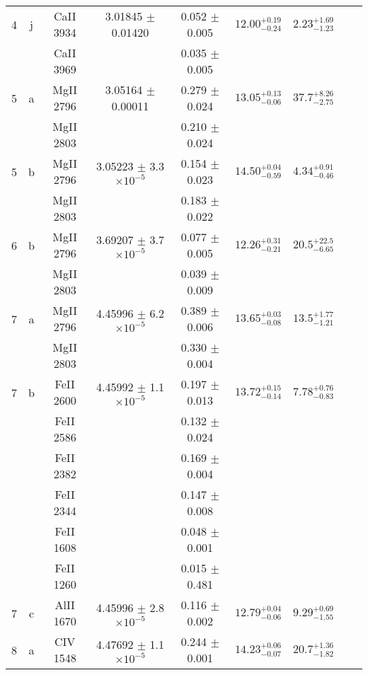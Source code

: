 \documentclass[12pt]{article}
\begin{document}
\begin{footnotesize}
\begin{longtable}{ c c c c c c c c c}
       4  & j  & CaII     3934  &  3.01845 $\pm$ 0.01420  &  0.052 $\pm$ 0.005   & $12.00_{ - 0.24}^{ + 0.19}$  & $2.23_{ - 1.23}^{ + 1.69}$    & 	 & \\ 
  &   & CaII     3969  &  &  0.035 $\pm$ 0.005   &   &     & 	 & \\ 
       5  & a  & MgII     2796  &  3.05164 $\pm$ 0.00011  &  0.279 $\pm$ 0.024   & $13.05_{ - 0.06}^{ + 0.13}$  & $37.7_{ - 2.75}^{ + 8.26}$    & 	 & \\ 
  &   & MgII     2803  &  &  0.210 $\pm$ 0.024   &   &     & 	 & \\ 
       5  & b  & MgII     2796  &  3.05223 $\pm$ 3.3 $\times 10^{-5}$   &  0.154 $\pm$ 0.023   & $14.50_{ - 0.59}^{ + 0.04}$  & $4.34_{ - 0.46}^{ + 0.91}$    & 	 & \\ 
  &   & MgII     2803  &  &  0.183 $\pm$ 0.022   &   &     & 	 & \\ 
       6  & b  & MgII     2796  &  3.69207 $\pm$ 3.7 $\times 10^{-5}$   &  0.077 $\pm$ 0.005   & $12.26_{ - 0.21}^{ + 0.31}$  & $20.5_{ - 6.65}^{ + 22.5}$    & 	 & \\ 
  &   & MgII     2803  &  &  0.039 $\pm$ 0.009   &   &     & 	 & \\ 
       7  & a  & MgII     2796  &  4.45996 $\pm$ 6.2 $\times 10^{-5}$   &  0.389 $\pm$ 0.006   & $13.65_{ - 0.08}^{ + 0.03}$  & $13.5_{ - 1.21}^{ + 1.77}$    & 	 & \\ 
  &   & MgII     2803  &  &  0.330 $\pm$ 0.004   &   &     & 	 & \\ 
       7  & b  & FeII     2600  &  4.45992 $\pm$ 1.1 $\times 10^{-5}$   &  0.197 $\pm$ 0.013   & $13.72_{ - 0.14}^{ + 0.15}$  & $7.78_{ - 0.83}^{ + 0.76}$    & 	 & \\ 
  &   & FeII     2586  &  &  0.132 $\pm$ 0.024   &   &     & 	 & \\ 
  &   & FeII     2382  &  &  0.169 $\pm$ 0.004   &   &     & 	 & \\ 
  &   & FeII     2344  &  &  0.147 $\pm$ 0.008   &   &     & 	 & \\ 
  &   & FeII     1608  &  &  0.048 $\pm$ 0.001   &   &     & 	 & \\ 
  &   & FeII     1260  &  &  0.015 $\pm$ 0.481   &   &     & 	 & \\ 
       7  & c  & AlII     1670  &  4.45996 $\pm$ 2.8 $\times 10^{-5}$   &  0.116 $\pm$ 0.002   & $12.79_{ - 0.06}^{ + 0.04}$  & $9.29_{ - 1.55}^{ + 0.69}$    & 	 & \\ 
       8  & a  & CIV     1548  &  4.47692 $\pm$ 1.1 $\times 10^{-5}$   &  0.244 $\pm$ 0.001   & $14.23_{ - 0.07}^{ + 0.06}$  & $20.7_{ - 1.82}^{ + 1.36}$    & 	 & \\ 

\end{longtable}
\end{footnotesize}
\end{document}
